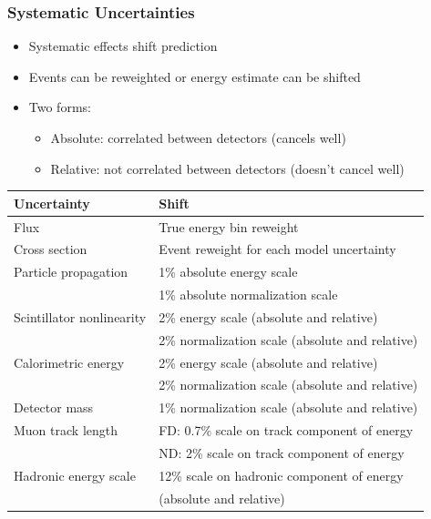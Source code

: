 \documentclass[10pt,professionalfonts,xcolor=table]{beamer}
\begin{document}
\begin{frame}
\frametitle{Systematic Uncertainties}
\begin{itemize}
\item Systematic effects shift prediction
\item Events can be reweighted or energy estimate can be shifted
\item Two forms:
  \begin{itemize}
  \item Absolute: correlated between detectors (cancels well)
  \item Relative: not correlated between detectors (doesn't cancel well)
  \end{itemize}
\end{itemize}
\gap
\begin{center}
\small
\begin{tabular}{ l | l }
 \textcolor{custom_red}{Uncertainty} & \textcolor{custom_red}{Shift} \\ \hline
Flux & True energy bin reweight \\ \hline
Cross section & Event reweight for each model uncertainty \\ \hline
Particle propagation & 1\% absolute energy scale  \\
&  1\% absolute normalization scale \\ \hline
Scintillator nonlinearity & 2\% energy scale (absolute and relative)  \\
&  2\% normalization scale (absolute and relative) \\ \hline
Calorimetric energy & 2\% energy scale (absolute and relative)  \\
&  2\% normalization scale (absolute and relative) \\ \hline
Detector mass &  1\% normalization scale (absolute and relative) \\ \hline
Muon track length &  FD: 0.7\% scale on track component of energy\\
 &  ND: 2\% scale on track component of energy\\ \hline
Hadronic energy scale &  12\% scale on hadronic component of energy \\
& (absolute and relative)\\
\end{tabular}

\end{center}


\end{frame}
\end{document}
